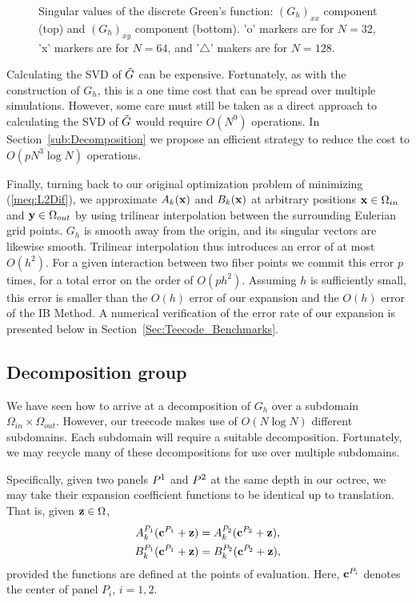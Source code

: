 \begin{figure}[htb]
\begin{center}
	\end{center}	
	\caption{Singular values of the discrete Green's function: $\left(G_h\right)_{xx}$ component (top) and $\left(G_h\right)_{xy}$ component (bottom). 'o' markers are for $N=32$, 'x' markers are for $N=64$, and '$\triangle$' makers are for $N=128$.}
	\label{fig:svalues_00}
\end{figure}

Calculating the SVD of $\tilde{G}$ can be expensive. Fortunately, as with the construction of $G_h$, this is a one time cost that can be spread over multiple simulations. However, some care must still be taken as a direct approach to calculating the SVD of $\tilde{G}$ would require $O(N^9)$ operations. In Section~\ref{sub:Decomposition} we propose an 
efficient strategy to reduce the cost to $O(pN^3\log N)$ operations.

Finally, turning back to our original optimization problem of minimizing (\ref{meq:L2Dif}), we approximate $A_k(\mathbf{x})$ and $B_k(\mathbf{x})$ at arbitrary positions $\mathbf{x}\in\Omega_{in}$ and $\mathbf{y}\in\Omega_{out}$ by using trilinear interpolation between the surrounding Eulerian grid points. $G_h$ is smooth away from the origin, and its singular vectors are likewise smooth. Trilinear interpolation thus introduces an error of at most $O(h^2)$. For a given interaction between two fiber points we commit this error $p$ times, for a total error on the order of $O(ph^2)$. Assuming $h$ is sufficiently small, this error is smaller than the $O(h)$ error of our expansion and the $O(h)$ error of the IB Method. A numerical verification of the error rate of our expansion is presented below in Section~\ref{Sec:Teecode_Benchmarks}.
\subsection{Decomposition group}
We have seen how to arrive at a decomposition of $G_h$ over a subdomain $\Omega_{in}\times\Omega_{out}$. However, our treecode makes use of $O(N \log N)$ different subdomains. Each subdomain will require a suitable decomposition. Fortunately, we may recycle many of these decompositions for use over multiple subdomains.

Specifically, given two panels $P^1$ and $P^2$ at the same depth in our octree, we may take their expansion coefficient functions to be identical up to translation. That is, given $\mathbf{z}\in\Omega$,
\begin{gather}
A_k^{P_1}(\mathbf{c}^{P_1}+\mathbf{z}) = A_k^{P_2}(\mathbf{c}^{P_2}+\mathbf{z}), \\
B_k^{P_1}(\mathbf{c}^{P_1}+\mathbf{z}) = B_k^{P_2}(\mathbf{c}^{P_2}+\mathbf{z}),
\end{gather}
provided the functions are defined at the points of evaluation. Here, $\mathbf{c}^{P_i}$ denotes the center of panel $P_i$, $i=1,2$.

